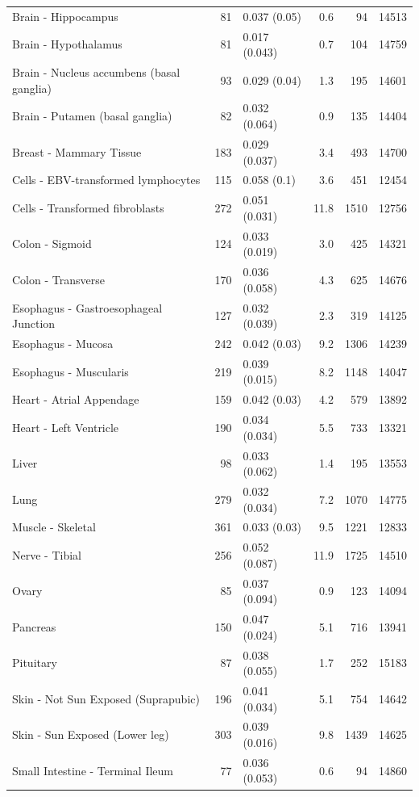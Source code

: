 \documentclass[10pt,letterpaper]{article}
\begin{document}
\begin{table}[!ht]
\begin{adjustwidth}{-2.25in}{0in}
\begin{tabular}{lrlrrr}
  Brain - Hippocampus & 81 & 0.037 (0.05) & 0.6 & 94 & 14513 \\ 
  Brain - Hypothalamus & 81 & 0.017 (0.043) & 0.7 & 104 & 14759 \\ 
  Brain - Nucleus accumbens (basal ganglia) & 93 & 0.029 (0.04) & 1.3 & 195 & 14601 \\ 
  Brain - Putamen (basal ganglia) & 82 & 0.032 (0.064) & 0.9 & 135 & 14404 \\ 
  Breast - Mammary Tissue & 183 & 0.029 (0.037) & 3.4 & 493 & 14700 \\ 
  Cells - EBV-transformed lymphocytes & 115 & 0.058 (0.1) & 3.6 & 451 & 12454 \\ 
  Cells - Transformed fibroblasts & 272 & 0.051 (0.031) & 11.8 & 1510 & 12756 \\ 
  Colon - Sigmoid & 124 & 0.033 (0.019) & 3.0 & 425 & 14321 \\ 
  Colon - Transverse & 170 & 0.036 (0.058) & 4.3 & 625 & 14676 \\ 
  Esophagus - Gastroesophageal Junction & 127 & 0.032 (0.039) & 2.3 & 319 & 14125 \\ 
  Esophagus - Mucosa & 242 & 0.042 (0.03) & 9.2 & 1306 & 14239 \\ 
  Esophagus - Muscularis & 219 & 0.039 (0.015) & 8.2 & 1148 & 14047 \\ 
  Heart - Atrial Appendage & 159 & 0.042 (0.03) & 4.2 & 579 & 13892 \\ 
  Heart - Left Ventricle & 190 & 0.034 (0.034) & 5.5 & 733 & 13321 \\ 
  Liver & 98 & 0.033 (0.062) & 1.4 & 195 & 13553 \\ 
  Lung & 279 & 0.032 (0.034) & 7.2 & 1070 & 14775 \\ 
  Muscle - Skeletal & 361 & 0.033 (0.03) & 9.5 & 1221 & 12833 \\ 
  Nerve - Tibial & 256 & 0.052 (0.087) & 11.9 & 1725 & 14510 \\ 
  Ovary & 85 & 0.037 (0.094) & 0.9 & 123 & 14094 \\ 
  Pancreas & 150 & 0.047 (0.024) & 5.1 & 716 & 13941 \\ 
  Pituitary & 87 & 0.038 (0.055) & 1.7 & 252 & 15183 \\ 
  Skin - Not Sun Exposed (Suprapubic) & 196 & 0.041 (0.034) & 5.1 & 754 & 14642 \\ 
  Skin - Sun Exposed (Lower leg) & 303 & 0.039 (0.016) & 9.8 & 1439 & 14625 \\ 
  Small Intestine - Terminal Ileum & 77 & 0.036 (0.053) & 0.6 & 94 & 14860 \\ 

\end{tabular}
\end{adjustwidth}
\end{table}
\end{document}
